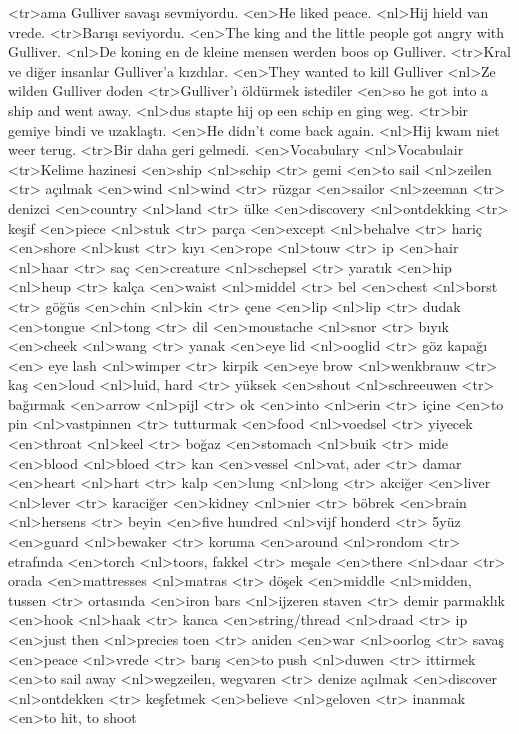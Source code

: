 <tr>ama Gulliver savaşı sevmiyordu.
<en>He liked peace.
<nl>Hij hield van vrede.
<tr>Barışı seviyordu.
<en>The king and the little people got angry with Gulliver.
<nl>De koning en de kleine mensen werden boos op Gulliver.
<tr>Kral ve diğer insanlar Gulliver’a kızdılar.
<en>They wanted to kill Gulliver
<nl>Ze wilden Gulliver doden
<tr>Gulliver’ı öldürmek istediler
<en>so he got into a ship and went away.
<nl>dus stapte hij op een schip  en ging weg.
<tr>bir gemiye bindi ve uzaklaştı.
<en>He didn’t come back again.
<nl>Hij kwam niet weer terug.
<tr>Bir daha geri gelmedi.
<en>Vocabulary
<nl>Vocabulair
<tr>Kelime hazinesi
<en>ship 
<nl>schip 
<tr> gemi
<en>to sail 
<nl>zeilen 
<tr> açılmak
<en>wind 
<nl>wind 
<tr> rüzgar
<en>sailor 
<nl>zeeman 
<tr> denizci
<en>country 
<nl>land 
<tr> ülke
<en>discovery 
<nl>ontdekking
<tr> keşif
<en>piece 
<nl>stuk
<tr> parça
<en>except 
<nl>behalve
<tr> hariç
<en>shore 
<nl>kust
<tr> kıyı
<en>rope 
<nl>touw
<tr> ip
<en>hair 
<nl>haar
<tr> saç
<en>creature 
<nl>schepsel
<tr> yaratık
<en>hip 
<nl>heup
<tr> kalça
<en>waist 
<nl>middel
<tr> bel
<en>chest 
<nl>borst
<tr> göğüs
<en>chin 
<nl>kin
<tr> çene
<en>lip 
<nl>lip
<tr> dudak
<en>tongue 
<nl>tong
<tr> dil
<en>moustache 
<nl>snor
<tr> bıyık
<en>cheek 
<nl>wang
<tr> yanak
<en>eye lid 
<nl>ooglid
<tr> göz kapağı
<en> eye lash 
<nl>wimper
<tr> kirpik
<en>eye brow 
<nl>wenkbrauw
<tr> kaş
<en>loud 
<nl>luid, hard
<tr> yüksek
<en>shout 
<nl>schreeuwen
<tr> bağırmak
<en>arrow 
<nl>pijl
<tr> ok
<en>into 
<nl>erin
<tr> içine
<en>to pin 
<nl>vastpinnen
<tr> tutturmak
<en>food 
<nl>voedsel
<tr> yiyecek
<en>throat 
<nl>keel
<tr> boğaz
<en>stomach 
<nl>buik
<tr> mide
<en>blood 
<nl>bloed
<tr> kan
<en>vessel 
<nl>vat, ader
<tr> damar
<en>heart 
<nl>hart
<tr> kalp
<en>lung 
<nl>long
<tr> akciğer
<en>liver 
<nl>lever
<tr> karaciğer
<en>kidney 
<nl>nier
<tr> böbrek
<en>brain 
<nl>hersens
<tr> beyin
<en>five hundred 
<nl>vijf honderd
<tr> 5yüz
<en>guard 
<nl>bewaker
<tr> koruma
<en>around 
<nl>rondom
<tr> etrafında
<en>torch 
<nl>toors, fakkel
<tr> meşale
<en>there 
<nl>daar
<tr> orada
<en>mattresses 
<nl>matras
<tr> döşek
<en>middle 
<nl>midden, tussen
<tr> ortasında
<en>iron bars 
<nl>ijzeren staven
<tr> demir parmaklık
<en>hook 
<nl>haak
<tr> kanca
<en>string/thread 
<nl>draad
<tr> ip
<en>just then 
<nl>precies toen
<tr> aniden
<en>war 
<nl>oorlog
<tr> savaş
<en>peace 
<nl>vrede
<tr> barış
<en>to push 
<nl>duwen
<tr> ittirmek
<en>to sail away 
<nl>wegzeilen, wegvaren
<tr> denize açılmak
<en>discover 
<nl>ontdekken
<tr> keşfetmek
<en>believe 
<nl>geloven
<tr> inanmak
<en>to hit, to shoot 

